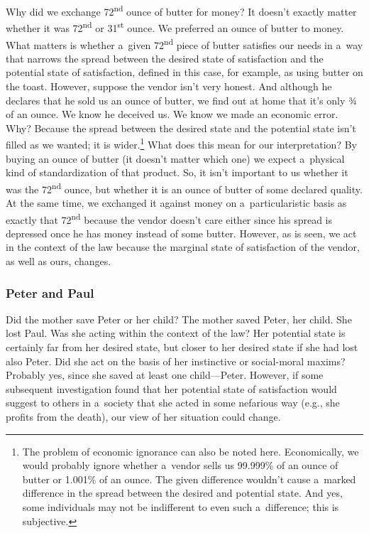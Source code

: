 Why did we exchange 72\textsuperscript{nd} ounce of butter for money? It doesn't exactly matter whether it was 72\textsuperscript{nd} or 31\textsuperscript{st} ounce. We preferred an ounce of butter to money. What matters is whether a~given 72\textsuperscript{nd} piece of butter satisfies our needs in a~way that narrows the spread between the desired state of satisfaction and the potential state of satisfaction, defined in this case, for example, as using butter on the toast. However, suppose the vendor isn't very honest. And although he declares that he sold us an ounce of butter, we find out at home that it's only ¾ of an ounce. We know he deceived us. We know we made an economic error. Why? Because the spread between the desired state and the potential state isn't filled as we wanted; it is wider.\footnote{The problem of economic ignorance can also be noted here. Economically, we would probably ignore whether a~vendor sells us 99.999\% of an ounce of butter or 1.001\% of an ounce. The given difference wouldn't cause a~marked difference in the spread between the desired and potential state. And yes, some individuals may not be indifferent to even such a~difference; this is subjective.} What does this mean for our interpretation? By buying an ounce of butter (it doesn't matter which one) we expect a~physical kind of standardization of that product. So, it isn't important to us whether it was the 72\textsuperscript{nd} ounce, but whether it is an ounce of butter of some declared quality. At the same time, we exchanged it against money on a~particularistic basis as exactly that 72\textsuperscript{nd} because the vendor doesn't care either since his spread is depressed once he has money instead of some butter. However, as is seen, we act in the context of the law because the marginal state of satisfaction of the vendor, as well as ours, changes.



\subsubsection*{Peter and Paul }



Did the mother save Peter or her child? The mother saved Peter, her child. She lost Paul. Was she acting within the context of the law? Her potential state is certainly far from her desired state, but closer to her desired state if she had lost also Peter. Did she act on the basis of her instinctive or social-moral maxims? Probably yes, since she saved at least one child---Peter. However, if some subsequent investigation found that her potential state of satisfaction would suggest to others in a~society that she acted in some nefarious way (e.g., she profits from the death), our view of her situation could change.



